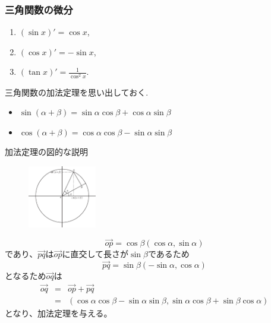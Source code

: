 \begin{frame}
\frametitle{三角関数の微分}



\begin{Thm} \label{三角関数微分}
\begin{enumerate}
\item $(\sin x)'=\cos x$,
\item  $(\cos x)' = -\sin x$,
\item $(\tan x)'=\frac{1}{\cos^2 x}$. 
\end{enumerate}
\end{Thm}

三角関数の加法定理を思い出しておく. 
\begin{itemize}
\item $\sin(\alpha+\beta)=\sin \alpha \cos \beta + \cos \alpha \sin \beta$
\item $\cos(\alpha+\beta)=\cos \alpha \cos \beta - \sin \alpha \sin \beta$
\end{itemize}

\end{frame}
\begin{slide}{加法定理の図的な説明}
\begin{figure}[h]                                                                      
\centering
\includegraphics[width=3cm]{calculus5/add.eps}
\end{figure}
\begin{equation}
\overrightarrow{op} = \cos{\beta}(\cos{\alpha}, \sin{\alpha})
\end{equation}
であり、$\overrightarrow{pq}$は$\overrightarrow{op}$に直交して長さが$\sin{\beta}$であるため
\begin{equation}
\overrightarrow{pq} = \sin{\beta}(-\sin{\alpha}, \cos{\alpha})
\end{equation}
となるため$\overrightarrow{oq}$は
\begin{eqnarray}
\overrightarrow{oq} &=& \overrightarrow{op}+\overrightarrow{pq}\nonumber \\
&=& (\cos{\alpha}\cos{\beta} - \sin{\alpha}\sin{\beta}, \sin{\alpha}\cos{\beta}+\sin{\beta}\cos{\alpha})
\end{eqnarray}
となり、加法定理を与える。
\end{slide}


